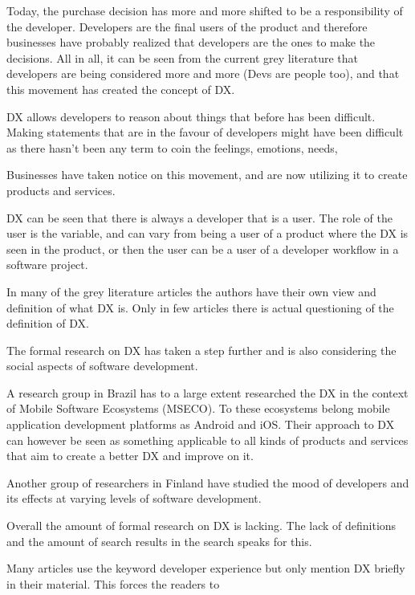 \documentclass[english, 12pt, a4paper, sci, utf8, a-1b, online]{aaltothesis}
\begin{document}
Today, the purchase decision has more and more shifted to be a responsibility of the developer. Developers are the final users of the product and therefore businesses have probably realized that developers are the ones to make the decisions. All in all, it can be seen from the current grey literature that developers are being considered more and more (Devs are people too), and that this movement has created the concept of DX.

DX allows developers to reason about things that before has been difficult. Making statements that are in the favour of developers might have been difficult as there hasn't been any term to coin the feelings, emotions, needs,

Businesses have taken notice on this movement, and are now utilizing it to create products and services.

DX can be seen that there is always a developer that is a user. The role of the user is the variable, and can vary from being a user of a product where the DX is seen in the product, or then the user can be a user of a developer workflow in a software project.

In many of the grey literature articles the authors have their own view and definition of what DX is. Only in few articles there is actual questioning of the definition of DX.

The formal research on DX has taken a step further and is also considering the social aspects of software development.

A research group in Brazil has to a large extent researched the DX in the context of Mobile Software Ecosystems (MSECO). To these ecosystems belong mobile application development platforms as Android and iOS. Their approach to DX can however be seen as something applicable to all kinds of products and services that aim to create a better DX and improve on it.

Another group of researchers in Finland have studied the mood of developers and its effects at varying levels of software development.

Overall the amount of formal research on DX is lacking. The lack of definitions and the amount of search results in the search speaks for this.


Many articles use the keyword developer experience but only mention DX briefly in their material. This forces the readers to
\end{document}
